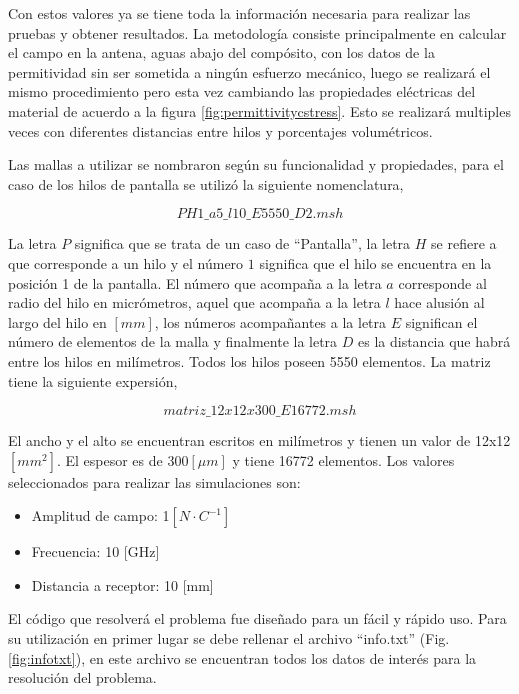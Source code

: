 \documentclass[12pt,letterpaper]{article}
\numberwithin{equation}{section}
\begin{document}
Con estos valores ya se tiene toda la información necesaria para realizar las pruebas y obtener resultados. La metodología consiste principalmente en calcular el campo en la antena, aguas abajo del compósito, con los datos de la permitividad sin ser sometida a ningún esfuerzo mecánico, luego se realizará el mismo procedimiento pero esta vez cambiando las propiedades eléctricas del material de acuerdo a la figura \ref{fig:permittivitycstress}. Esto se realizará multiples veces con diferentes distancias entre hilos y porcentajes volumétricos.

Las mallas a utilizar se nombraron según su funcionalidad y propiedades, para el caso de los hilos de pantalla se utilizó la siguiente nomenclatura,

$$PH1\_a5\_l10\_E5550\_D2.msh$$

La letra $P$ significa que se trata de un caso de ``Pantalla'', la letra $H$ se refiere a que corresponde a un hilo y el número $1$ significa que el hilo se encuentra en la posición 1 de la pantalla. El número que acompaña a la letra $a$ corresponde al radio del hilo en micrómetros, aquel que acompaña a la letra $l$ hace alusión al largo del hilo en $[mm]$, los números acompañantes a la letra $E$ significan el número de elementos de la malla y finalmente la letra $D$ es la distancia que habrá entre los hilos en milímetros. Todos los hilos poseen 5550 elementos. La matriz tiene la siguiente expersión,

$$matriz\_12x12x300\_E16772.msh$$

El ancho y el alto se encuentran escritos en milímetros y tienen un valor de 12x12 $[mm^2]$. El espesor es de 300$[\mu m]$ y tiene 16772 elementos. Los valores seleccionados para realizar las simulaciones son:

\begin{itemize}
	\item Amplitud de campo: 1$[N\cdot C^{-1}]$
	\item Frecuencia: 10 [GHz]
	\item Distancia a receptor: 10 [mm]
\end{itemize}

El código que resolverá el problema fue diseñado para un fácil y rápido uso. Para su utilización en primer lugar se debe rellenar el archivo ``info.txt'' (Fig. \ref{fig:infotxt}), en este archivo se encuentran todos los datos de interés para la resolución del problema.
\end{document}
